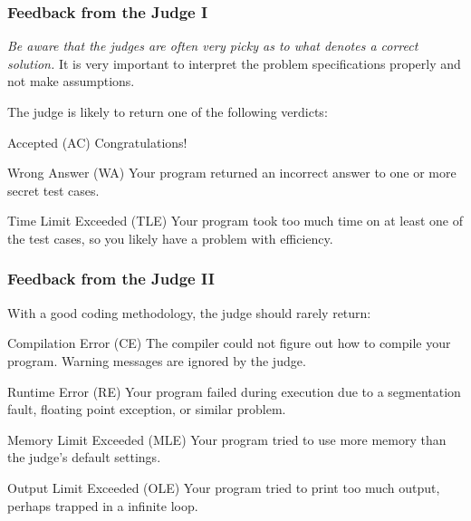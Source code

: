 \documentclass{beamer}
\begin{document}
\begin{frame}
  \frametitle{Feedback from the Judge I}
  \emph{Be aware that the judges are often very picky as to what denotes a correct solution.}
  It is very important to interpret the problem specifications properly and not make assumptions.

  The judge is likely to return one of the following verdicts:

  \begin{block}{Accepted (AC)}
    Congratulations! 
  \end{block}

  \begin{block}{Wrong Answer (WA)}
    Your program returned an incorrect answer to one or more secret test cases.
  \end{block}

  \begin{block}{Time Limit Exceeded (TLE)}
    Your program took too much time on at least one of the test cases, so you likely have a problem with efficiency.
  \end{block}

\end{frame}

\begin{frame}
  \frametitle{Feedback from the Judge II}
  With a good coding methodology, the judge should rarely return:
  \begin{block}{Compilation Error (CE)}
    The compiler could not figure out how to compile your program. Warning messages are ignored by the judge.
  \end{block}

  \begin{block}{Runtime Error (RE)}
    Your program failed during execution due to a segmentation fault, floating point exception, or similar problem.
  \end{block}

  \begin{block}{Memory Limit Exceeded (MLE)}
    Your program tried to use more memory than the judge’s default settings.
  \end{block}

  \begin{block}{Output Limit Exceeded (OLE)}
    Your program tried to print too much output, perhaps trapped in a infinite loop.
  \end{block}

\end{frame}
\end{document}
